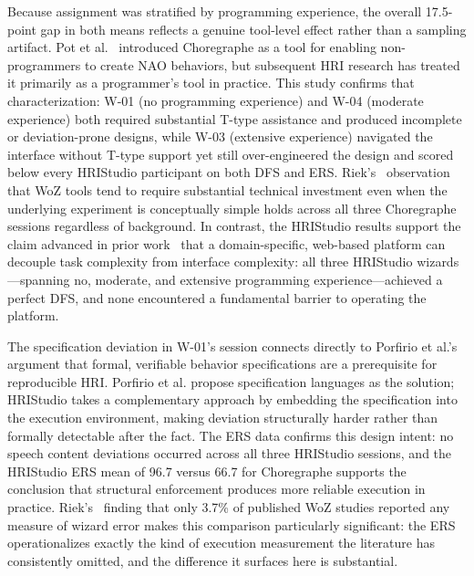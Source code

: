 Because assignment was stratified by programming experience, the overall 17.5-point gap in both means reflects a genuine tool-level effect rather than a sampling artifact. Pot et al.~\cite{Pot2009} introduced Choregraphe as a tool for enabling non-programmers to create NAO behaviors, but subsequent HRI research has treated it primarily as a programmer's tool in practice. This study confirms that characterization: W-01 (no programming experience) and W-04 (moderate experience) both required substantial T-type assistance and produced incomplete or deviation-prone designs, while W-03 (extensive experience) navigated the interface without T-type support yet still over-engineered the design and scored below every HRIStudio participant on both DFS and ERS. Riek's~\cite{Riek2012} observation that WoZ tools tend to require substantial technical investment even when the underlying experiment is conceptually simple holds across all three Choregraphe sessions regardless of background. In contrast, the HRIStudio results support the claim advanced in prior work~\cite{OConnor2024, OConnor2025} that a domain-specific, web-based platform can decouple task complexity from interface complexity: all three HRIStudio wizards---spanning no, moderate, and extensive programming experience---achieved a perfect DFS, and none encountered a fundamental barrier to operating the platform.

The specification deviation in W-01's session connects directly to Porfirio et al.'s~\cite{Porfirio2023} argument that formal, verifiable behavior specifications are a prerequisite for reproducible HRI. Porfirio et al. propose specification languages as the solution; HRIStudio takes a complementary approach by embedding the specification into the execution environment, making deviation structurally harder rather than formally detectable after the fact. The ERS data confirms this design intent: no speech content deviations occurred across all three HRIStudio sessions, and the HRIStudio ERS mean of 96.7 versus 66.7 for Choregraphe supports the conclusion that structural enforcement produces more reliable execution in practice. Riek's~\cite{Riek2012} finding that only 3.7\% of published WoZ studies reported any measure of wizard error makes this comparison particularly significant: the ERS operationalizes exactly the kind of execution measurement the literature has consistently omitted, and the difference it surfaces here is substantial.

